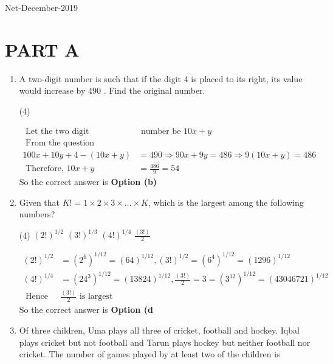 \begin{abox}
	Net-December-2019
	\end{abox}
\section{PART A}
\begin{enumerate}
	\item A two-digit number is such that if the digit 4 is placed to its right, its value would increase by 490 . Find the original number.
	 \begin{tasks}(4)
	\end{tasks}
\begin{answer}
	\begin{align*}
	\text{ Let the two digit}&\text{ number be $10 x+y$}\\
\text{	From the question}&\\
	100 x+10 y+4-(10 x+y)&=490 \Rightarrow 90 x+9 y=486 \Rightarrow 9(10 x+y)=486\\
\text{	Therefore, }10 x+y&=\frac{486}{9}=54
	\end{align*}
			So the correct answer is \textbf{Option (b)}
\end{answer}
\item  Given that $K !=1 \times 2 \times 3 \times \ldots \times K$, which is the largest among the following numbers?
	 \begin{tasks}(4)
		\task[\textbf{a.}]$(2 !)^{1 / 2}$
		\task[\textbf{b.}]$(3 !)^{1 / 3}$
		\task[\textbf{c.}] $(4 !)^{1 / 4}$
		\task[\textbf{d.}] $\frac{(3 !)}{2}$
	\end{tasks}
\begin{answer}
	\begin{align*}
(2 !)^{1 / 2}&=\left(2^{6}\right)^{1 / 12}=(64)^{1 / 12},(3 !)^{1 / 2}=\left(6^{4}\right)^{1 / 12}=(1296)^{1 / 12}\\
	(4 !)^{1 / 4}&=\left(24^{3}\right)^{1 / 12}=(13824)^{1 / 12}, \frac{(3 !)}{2}=3=\left(3^{12}\right)^{1 / 12}=(43046721)^{1 / 12}\\
\text{	Hence }&\frac{(3 !)}{2}\text{ is largest}
	\end{align*}
		So the correct answer is \textbf{Option (d}
\end{answer}
\item  Of three children, Uma plays all three of cricket, football and hockey. Iqbal plays cricket but not football and Tarun plays hockey but neither football nor cricket. The number of games played by at least two of the children is

\end{enumerate}
